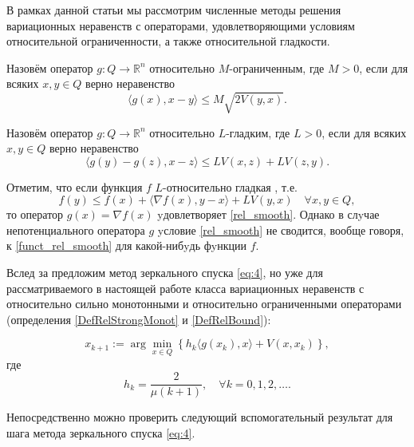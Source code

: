 В рамках данной статьи мы рассмотрим численные методы решения вариационных неравенств с операторами, удовлетворяющими условиям относительной ограниченности, а также относительной гладкости.
\begin{definition}\label{DefRelBound}\cite{Main}
Назовём оператор $g: Q \longrightarrow \mathbb{R}^n$ относительно $M$-огранич\-енным, где $M >0$, если для всяких $x, y \in Q$ верно неравенство
	\begin{equation}\label{rel_bound}
	 	\langle g(x), x - y \rangle \leq M\sqrt{2V(y,x)}.
	 \end{equation}
\end{definition}
\begin{definition}\cite{Inex}
Назовём оператор $g: Q \longrightarrow \mathbb{R}^n$ относительно $L$-гладким, где $L > 0$, если для всяких $x, y \in Q$ верно неравенство
\begin{equation}\label{rel_smooth}
    \langle g(y)-g(z),x-z\rangle \leq LV(x,z) + LV(z,y).
    \end{equation}
\end{definition}
Отметим, что если функция $f$ $L$-относительно гладкая \cite{Bauschke}, т.е.
\begin{equation}\label{funct_rel_smooth}
f(y) \leq f(x) + \langle \nabla f(x), y - x\rangle + LV(y, x) \quad \forall x, y \in Q,
\end{equation}
то оператор $g(x) = \nabla f(x)$ yдовлетворяет \eqref{rel_smooth}. Однако в слyчае непотенциального оператора $g$ yсловие \eqref{rel_smooth} не сводится, вообще говоря, к \eqref{funct_rel_smooth} для какой-нибyдь фyнкции $f$.


Вслед за \cite{Simon_Julien_Bach_2012} предложим метод зеркального спуска \eqref{eq:4}, но уже для рассматриваемого в настоящей работе класса  вариационных неравенств с относительно сильно монотонными и относительно ограниченными операторами (определения \ref{DefRelStrongMonot} и \ref{DefRelBound}):

\begin{equation} \label{eq:4}
x_{k+1} := \arg \min_{x \in Q} \left\{ h_k \langle g(x_k), x \rangle + V(x, x_k)\right\},
\end{equation}
где
$$
    h_k = \frac{2}{\mu(k+1)},\quad  \forall k= 0,1, 2, \ldots.
$$

Непосредственно можно проверить следующий вспомогательный результат для шага метода зеркального спуска \eqref{eq:4}.

